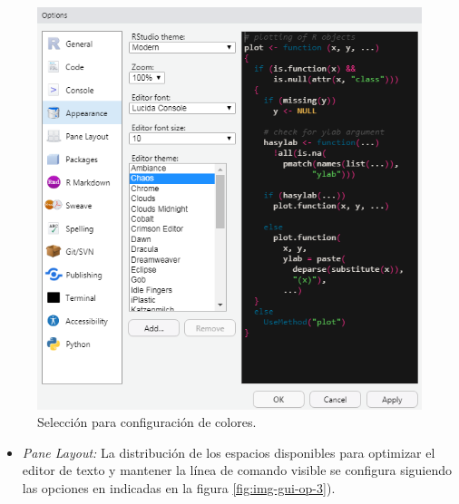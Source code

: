 \documentclass[
]{book}
\providecommand{\tightlist}{%
  \setlength{\itemsep}{0pt}\setlength{\parskip}{0pt}}
\begin{document}
\begin{figure}

{\centering \includegraphics[width=8.1in]{img/ops-app} 

}

\caption{Selección para configuración de colores.}\label{fig:img-gui-op-2}
\end{figure}

\begin{itemize}
\tightlist
\item
  \emph{Pane Layout:} La distribución de los espacios disponibles para optimizar el editor de texto y mantener la línea de comando visible se configura siguiendo las opciones en indicadas en la figura \ref{fig:img-gui-op-3}).
\end{itemize}
\end{document}
